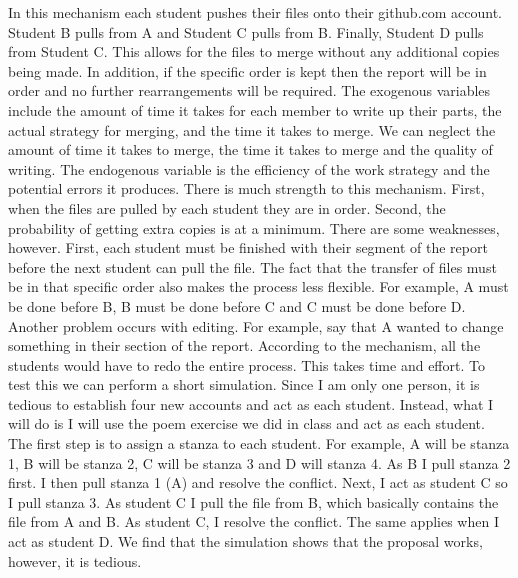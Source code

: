 \documentclass[12pt]{article}
\begin{document}
 In this mechanism each student pushes their files onto their github.com account. Student B pulls from A and Student C pulls from B. Finally, Student D pulls from Student C. This allows for the files to merge without any additional copies being made. In addition, if the specific order is kept then the report will be in order and no further rearrangements will be required. The exogenous variables include the amount of time it takes for each member to write up their parts, the actual strategy for merging, and the time it takes to merge. We can neglect the amount of time it takes to merge, the time it takes to merge and the quality of writing. The endogenous variable is the efficiency of the work strategy and the potential errors it produces. 
\newline 
\newline 
There is much strength to this mechanism. First, when the files are pulled by each student they are in order. Second, the probability of getting extra copies is at a minimum. There are some weaknesses, however. First, each student must be finished with their segment of the report before the next student can pull the file. The fact that the transfer of files must be in that specific order also makes the process less flexible. For example, A must be done before B, B must be done before C and C must be done before D. Another problem occurs with editing. For example, say that A wanted to change something in their section of the report. According to the mechanism, all the students would have to redo the entire process. This takes time and effort.
\newline 
\newline 
To test this we can perform a short simulation. Since I am only one person, it is tedious to establish four new accounts and act as each student. Instead, what I will do is I will use the poem exercise we did in class and act as each student. The first step is to assign a stanza to each student. For example, A will be stanza 1, B will be stanza 2, C will be stanza 3 and D will stanza 4. As B I pull stanza 2 first. I then pull stanza 1 (A) and resolve the conflict. Next, I act as student C so I pull stanza 3. As student C I pull the file from B, which basically contains the file from A and B. As student C, I resolve the conflict. The same applies when I act as student D. We find that the simulation shows that the proposal works, however, it is tedious. 
 
\end{document}

